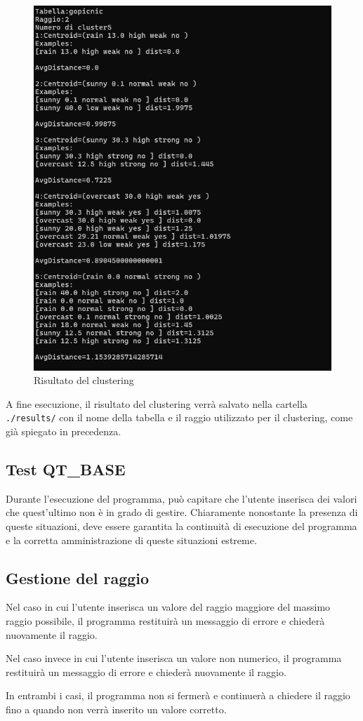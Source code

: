 \begin{figure}[h!]
    \centering
    \includegraphics[width = 0.5 \textwidth]{images/risultato atteso.png}
    \caption{Risultato del clustering}
\end{figure}

A fine esecuzione, il risultato del clustering verrà salvato nella cartella \texttt{./results/} con il nome della tabella e il raggio utilizzato per il clustering, come già spiegato in precedenza.

\subsection{Test QT\_BASE}

Durante l'esecuzione del programma, può capitare che l'utente inserisca dei valori che quest'ultimo non è in grado di gestire. Chiaramente nonostante la presenza di queste situazioni, deve essere garantita la continuità di esecuzione del programma e la corretta amministrazione di queste situazioni estreme.

\subsection*{Gestione del raggio}

Nel caso in cui l'utente inserisca un valore del raggio maggiore del massimo raggio possibile, il programma restituirà un messaggio di errore e chiederà nuovamente il raggio.

Nel caso invece in cui l'utente inserisca un valore non numerico, il programma restituirà un messaggio di errore e chiederà nuovamente il raggio.

In entrambi i casi, il programma non si fermerà e continuerà a chiedere il raggio fino a quando non verrà inserito un valore corretto.

